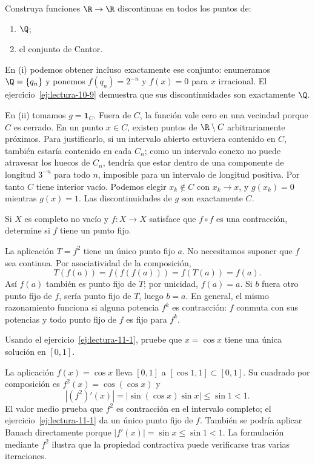 \begin{ejercicio}\label{ej:lectura-10-10}
Construya funciones $\R\to\R$ discontinuas en todos los puntos de: \begin{enumerate}[label=(\roman*)]\item $\Q$;\item el conjunto de Cantor.\end{enumerate}
\end{ejercicio}
\begin{solucion}
En (i) podemos obtener incluso exactamente ese conjunto: enumeramos $\Q=\{q_n\}$ y ponemos $f(q_n)=2^{-n}$ y $f(x)=0$ para $x$ irracional. El ejercicio~\ref{ej:lectura-10-9} demuestra que sus discontinuidades son exactamente $\Q$.

En (ii) tomamos $g=\mathbf1_C$. Fuera de $C$, la función vale cero en una vecindad porque $C$ es cerrado. En un punto $x\in C$, existen puntos de $\R\setminus C$ arbitrariamente próximos. Para justificarlo, si un intervalo abierto estuviera contenido en $C$, también estaría contenido en cada $C_n$; como un intervalo conexo no puede atravesar los huecos de $C_n$, tendría que estar dentro de una componente de longitud $3^{-n}$ para todo $n$, imposible para un intervalo de longitud positiva. Por tanto $C$ tiene interior vacío. Podemos elegir $x_k\notin C$ con $x_k\to x$, y $g(x_k)=0$ mientras $g(x)=1$. Las discontinuidades de $g$ son exactamente $C$.
\end{solucion}

\begin{ejercicio}\label{ej:lectura-11-1}
Si $X$ es completo no vacío y $f:X\to X$ satisface que $f\circ f$ es una contracción, determine si $f$ tiene un punto fijo.
\end{ejercicio}
\begin{solucion}
La aplicación $T=f^2$ tiene un único punto fijo $a$. No necesitamos suponer que $f$ sea continua. Por asociatividad de la composición,
\[
 T(f(a))=f(f(f(a)))=f(T(a))=f(a).
\]
Así $f(a)$ también es punto fijo de $T$; por unicidad, $f(a)=a$. Si $b$ fuera otro punto fijo de $f$, sería punto fijo de $T$, luego $b=a$. En general, el mismo razonamiento funciona si alguna potencia $f^k$ es contracción: $f$ conmuta con sus potencias y todo punto fijo de $f$ es fijo para $f^k$.
\end{solucion}

\begin{ejercicio}\label{ej:lectura-11-2}
Usando el ejercicio~\ref{ej:lectura-11-1}, pruebe que $x=\cos x$ tiene una única solución en $[0,1]$.
\end{ejercicio}
\begin{solucion}
La aplicación $f(x)=\cos x$ lleva $[0,1]$ a $[\cos1,1]\subset[0,1]$. Su cuadrado por composición es $f^2(x)=\cos(\cos x)$ y
\[
 |(f^2)'(x)|=|\sin(\cos x)\sin x|\leq\sin1<1.
\]
El valor medio prueba que $f^2$ es contracción en el intervalo completo; el ejercicio~\ref{ej:lectura-11-1} da un único punto fijo de $f$. También se podría aplicar Banach directamente porque $|f'(x)|=\sin x\leq\sin1<1$. La formulación mediante $f^2$ ilustra que la propiedad contractiva puede verificarse tras varias iteraciones.
\end{solucion}


